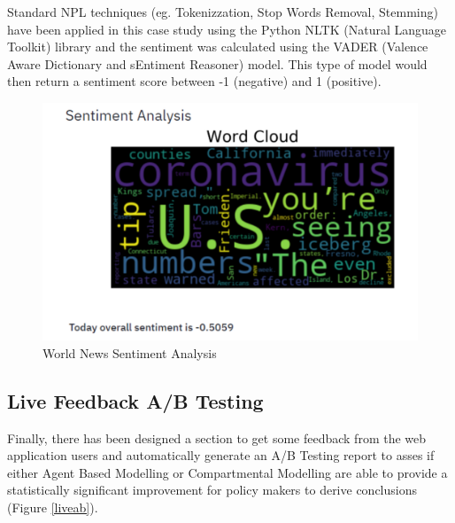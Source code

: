 Standard NPL techniques (eg. Tokenizzation, Stop Words Removal, Stemming) have been applied in this case study using the Python NLTK (Natural Language Toolkit) library and the sentiment was calculated using the VADER (Valence Aware Dictionary and sEntiment Reasoner) model. This type of model would then return a sentiment score between -1 (negative) and 1 (positive).

\begin{figure}[ht!]%
    \centering
    \includegraphics[width=0.8\linewidth]{latex/images/news2.pdf}
    \caption{World News Sentiment Analysis}
    \label{news2}
\end{figure}

\subsection{Live Feedback A/B Testing}
Finally, there has been designed a section to get some feedback from the web application users and automatically generate an A/B Testing report to asses if either Agent Based Modelling or Compartmental Modelling are able to provide a statistically significant improvement for policy makers to derive conclusions (Figure \ref{liveab}).  

